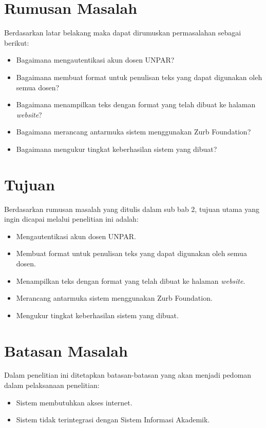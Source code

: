 \section{Rumusan Masalah}
Berdasarkan latar belakang maka dapat dirumuskan permasalahan sebagai berikut:
\begin{itemize}
	\item Bagaimana mengautentikasi akun dosen UNPAR?
	\item Bagaimana membuat format untuk penulisan teks yang dapat digunakan oleh semua dosen?
	\item Bagaimana menampilkan teks dengan format yang telah dibuat ke halaman {\it website}?
	\item Bagaimana merancang antarmuka sistem menggunakan Zurb Foundation?
	\item Bagaimana mengukur tingkat keberhasilan sistem yang dibuat?
\end{itemize}

\section{Tujuan}
Berdasarkan rumusan masalah yang ditulis dalam sub bab 2, tujuan utama yang
ingin dicapai melalui penelitian ini adalah:
\begin{itemize}
	\item Mengautentikasi akun dosen UNPAR.
	\item Membuat format untuk penulisan teks yang dapat digunakan oleh semua dosen.
	\item Menampilkan teks dengan format yang telah dibuat ke halaman {\it website}.
	\item Merancang antarmuka sistem menggunakan Zurb Foundation.
	\item Mengukur tingkat keberhasilan sistem yang dibuat.
\end{itemize}

\section{Batasan Masalah}
Dalam penelitian ini ditetapkan batasan-batasan yang akan menjadi pedoman dalam
pelaksanaan penelitian:
\begin{itemize}
    \item Sistem membutuhkan akses internet.
	\item Sistem tidak terintegrasi dengan Sistem Informasi Akademik.
\end{itemize}

